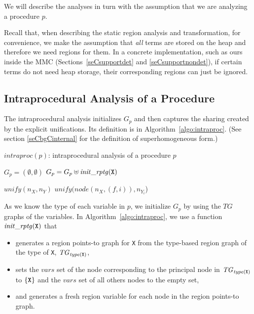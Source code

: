 \documentclass{tlp}
\def\TG{\mathit{TG}}
\def\varset{\mathit{vars}}
\newcommand{\args}[2][X]{\ensuremath{#1_1, \ldots, #1_#2}}
\newcommand{\code}[1]{{\tt#1}}
\begin{document}
We will describe the analyses in turn
with the assumption that we are analyzing a procedure $p$.

Recall that, when describing the static region analysis and transformation,
for convenience, we make the assumption that
\emph{all} terms are stored on the heap and therefore we need regions for them.
In a concrete implementation, such as ours inside the MMC
(Sections~\ref{seCsupportdet} and \ref{seCsupportnondet}),
if certain terms do not need heap storage,
their corresponding regions can just be ignored.

\subsection{Intraprocedural Analysis of a Procedure}

The intraprocedural analysis initializes $G_p$
and then captures the sharing created by the explicit unifications.
Its definition is in Algorithm~\ref{algo:intraproc}.
(See section \ref{seCbgCinternal} for the definition of superhomogeneous form.)
\begin{algorithm}
    \small
    \caption{$\mathit{intraproc}(p)$:
        intraprocedural analysis of a procedure $p$}
    \label{algo:intraproc}
\begin{algorithmic}

    \STATE $G_p = (\emptyset, \emptyset)$
    \FORALL{$\code{X} \in p$}
        \STATE $G_p = G_p \uplus \mathit{init\_rptg}(\code{X})$
    \ENDFOR

        \IF{$\mathit{unif} \equiv (\code{X:=Y})$}
            \STATE $\mathit{unify}(n_X, n_Y)$
        \ELSIF{$\mathit{unif} \equiv (\code{X = > f(\args[Y]{n})}\hspace{1mm}
        \mathit{or}\hspace{1mm}\code{X < = f(\args[Y]{n})})$}
                \STATE $\mathit{unify}(\mathit{node}(n_X, (f, i)), n_{Y_i}$)
            \ENDFOR
        \ENDIF
    \ENDFOR

\end{algorithmic}
\normalsize
\end{algorithm}

As we know the type of each variable in $p$,
we initialize $G_p$ by using
the $\TG$ graphs of the variables.
In Algorithm~\ref{algo:intraproc},
we use a function $\mathit{init\_rptg}(\code{X})$
that
\begin{itemize}
\item
    generates a region points-to graph for \code{X}
    from the type-based region graph of the type of \code{X},
    $\TG_{\mathit{type}(\code{X})}$,
\item
    sets the $\varset$ set of the node
    corresponding to the principal node in $\TG_{\mathit{type}(\code{X})}$
    to $\{\code{X}\}$
    and the $\varset$ set of all others nodes to the empty set,
\item
    and generates a fresh region variable
    for each node in the region points-to graph.
\end{itemize}
\end{document}
